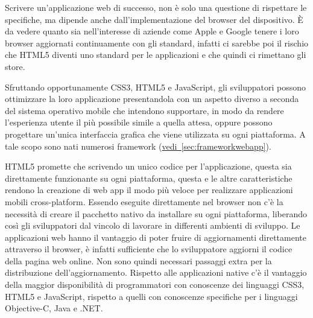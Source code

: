 		Scrivere un'applicazione web di successo, non è solo una questione di
		rispettare le specifiche, ma dipende anche dall'implementazione del 
		browser del dispositivo. È da vedere quanto sia nell'interesse di 
		aziende come Apple e Google tenere i loro browser aggiornati 
		continuamente con gli standard, infatti ci sarebbe poi il rischio che 
		HTML5 diventi uno standard per le applicazioni e che quindi ci rimettano 
		gli store\citep{White:Native-vs-Html}. 

		Sfruttando opportunamente CSS3, HTML5 e JavaScript, gli sviluppatori 
		possono ottimizzare la loro applicazione presentandola con un aspetto 
		diverso a seconda del sistema operativo mobile che intendono supportare, 
		in modo da rendere l'esperienza utente il più possibile simile a quella 
		attesa, oppure possono progettare un'unica interfaccia grafica che viene 
		utilizzata su ogni piattaforma. A tale scopo sono nati numerosi 
		framework (\hyperref[sec:frameworkwebapp]{vedi~\ref{sec:frameworkwebapp}}).

		HTML5 promette che scrivendo un unico codice per l'applicazione, 
		questa sia direttamente funzionante su ogni piattaforma, questa e le 
		altre caratteristiche rendono la creazione di web app il modo più veloce 
		per realizzare applicazioni mobili  cross-platform. Essendo eseguite 
		direttamente nel browser non c'è la necessità di creare il pacchetto 
		nativo da installare su ogni piattaforma, liberando così gli 
		sviluppatori dal vincolo di lavorare in differenti ambienti di sviluppo. 
		Le applicazioni web hanno il vantaggio di poter fruire di aggiornamenti 
		direttamente attraverso il browser, è infatti sufficiente che lo 
		sviluppatore aggiorni il codice della pagina web online. Non sono quindi
		necessari passaggi extra per la distribuzione dell'aggiornamento. 
		Rispetto alle applicazioni native c'è il vantaggio della maggior 
		disponibilità di programmatori con conoscenze dei linguaggi CSS3, HTML5 
		e JavaScript, rispetto a quelli con conoscenze specifiche per i 
		linguaggi Objective-C, Java e .NET.


